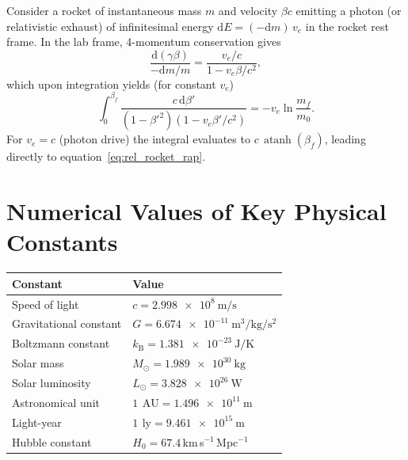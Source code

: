 \documentclass[12pt,a4paper]{article}
\newcommand{\dd}{\mathrm{d}}
\newcommand{\kB}{k_{\mathrm{B}}}
\newcommand{\AU}{\,\text{AU}}
\newcommand{\ly}{\,\text{ly}}
\newcommand{\Msun}{M_{\odot}}
\DeclareMathOperator{\atanh}{atanh}
\begin{document}
Consider a rocket of instantaneous mass $m$ and velocity $\beta c$ emitting
a photon (or relativistic exhaust) of infinitesimal energy $\dd E = (- \dd m)\,
v_e$ in the rocket rest frame. In the lab frame, 4-momentum conservation gives
\begin{equation}
  \frac{\dd(\gamma\beta)}{-\dd m/m} = \frac{v_e/c}{1 - v_e\beta/c^2},
\end{equation}
which upon integration yields (for constant $v_e$)
\begin{equation}
  \int_0^{\beta_f} \frac{c\,\dd\beta'}{(1-\beta'^2)(1 - v_e\beta'/c^2)}
  = -v_e \ln\frac{m_f}{m_0}.
\end{equation}
For $v_e = c$ (photon drive) the integral evaluates to $c\,\atanh(\beta_f)$,
leading directly to equation~\eqref{eq:rel_rocket_rap}.

\section{Numerical Values of Key Physical Constants}
\label{app:constants}

\begin{tabular}{ll}
  \toprule
  Constant & Value \\
  \midrule
  Speed of light & $c = \SI{2.998e8}{\meter\per\second}$ \\
  Gravitational constant & $G = \SI{6.674e-11}{\meter\cubed\per\kilo\gram\per\second\squared}$ \\
  Boltzmann constant & $\kB = \SI{1.381e-23}{\joule\per\kelvin}$ \\
  Solar mass & $\Msun = \SI{1.989e30}{\kilo\gram}$ \\
  Solar luminosity & $L_\odot = \SI{3.828e26}{\watt}$ \\
  Astronomical unit & $\SI{1}{\AU} = \SI{1.496e11}{\meter}$ \\
  Light-year & $\SI{1}{\ly} = \SI{9.461e15}{\meter}$ \\
  Hubble constant & $H_0 = 67.4$\,km\,s$^{-1}$\,Mpc$^{-1}$ \\
  \bottomrule
\end{tabular}



\end{document}
